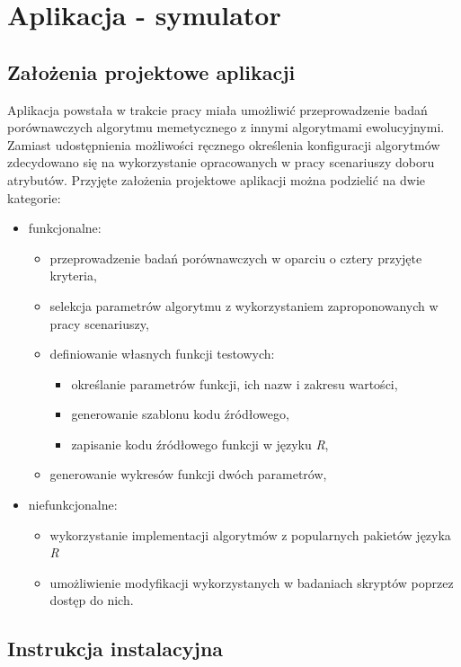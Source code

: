 \chapter{Aplikacja - symulator}
\label{ch:dodatekA-aplikacja}
\section{Założenia projektowe aplikacji}

\par
Aplikacja powstała w trakcie pracy miała umożliwić przeprowadzenie badań porównawczych algorytmu memetycznego z innymi algorytmami ewolucyjnymi. Zamiast udostępnienia możliwości ręcznego określenia konfiguracji algorytmów zdecydowano się na wykorzystanie opracowanych w pracy scenariuszy doboru atrybutów. Przyjęte założenia projektowe aplikacji można podzielić na dwie kategorie:
\begin{itemize}
\item funkcjonalne:
\begin{itemize}
\item przeprowadzenie badań porównawczych w oparciu o cztery przyjęte kryteria,
\item selekcja parametrów algorytmu z wykorzystaniem zaproponowanych w pracy scenariuszy,
\item definiowanie własnych funkcji testowych:
\begin{itemize}
\item określanie parametrów funkcji, ich nazw i zakresu wartości,
\item generowanie szablonu kodu źródłowego,
\item zapisanie kodu źródłowego funkcji w języku \emph{R},
\end{itemize}
\item generowanie wykresów funkcji dwóch parametrów,
\end{itemize}
\item niefunkcjonalne:
\begin{itemize}
\item wykorzystanie implementacji algorytmów z popularnych pakietów języka \emph{R}
\item umożliwienie modyfikacji wykorzystanych w badaniach skryptów poprzez dostęp do nich.
\end{itemize}
\end{itemize}

\section{Instrukcja instalacyjna}

